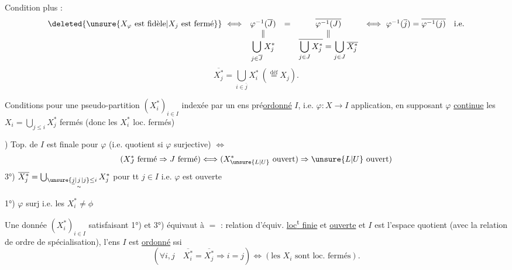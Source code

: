 Condition plus  : 
\[
\begin{array}{rclcl}
\deleted{\unsure{X_\varphi\text{ est fidèle}|X_j\text{ est fermé}}}\ \Longleftrightarrow&
\varphi^{-1}(\overline J)&=&\overline{\varphi^{-1}(J)}&
\Longleftrightarrow\ \varphi^{-1}(\overline j)=\overline{\varphi^{-1}(j)}\quad\text{i.e.}\\
&\Vert&&\Vert&\\
&\displaystyle\bigcup_{j\in\overline J}X_j^*&&
\displaystyle\overline{\bigcup_{j\in J}X_j^*}=\bigcup_{j\in J}\overline{X_j^*}&
\end{array}
\]
\[
\overline{X_j^*}=\bigcup_{i\in\overline j}X_i^*\ (\overset{\mathrm{déf}}=X_j).
\]

Conditions pour une pseudo-partition $(X_i^*)_{i\in I}$  indexée par un ens
pré\uline{ordonné} $I$, i.e. $\varphi:X\longrightarrow I$ application, en supposant $\varphi$ \uline{continue}
 les $X_i=\bigcup_{j\leq i}X_j^*$ fermés (donc les $X_i^*$ loc. fermés)

) Top. de $I$ est finale pour $\varphi$ (i.e. quotient si $\varphi$ surjective) $\Longleftrightarrow$
\[
(X_J^*\text{ fermé}\Rightarrow J\text{ fermé})\Longleftrightarrow
(X_{\unsure{L|U}}^*\text{ ouvert})\Rightarrow\unsure{L|U}\text{ ouvert})
\]
3°) $\overline{X_j^*}=\bigcup_{\unsure{\underline{j}|\underset{\sim}{j}|j}\leq i}X_j^*$ pour tt $j\in I$ i.e. $\varphi$ est ouverte

1°) $\varphi$ surj i.e. les $X_i^*\ne\phi$

Une donnée $(X_i^*)_{i\in I}$ satisfaisant 1°) et 3°) équivaut à
$=$ :  relation d'équiv. \uline{loc\textsuperscript{t} finie} et \uline{ouverte}
et $I$ est l'espace quotient (avec la relation de ordre
de spécialisation),  l'ens $I$ est \uline{ordonné} ssi
\[
(\forall i,j\quad\overline{X_i^*}=\overline{X_j^*}\Rightarrow i=j)
\Longleftrightarrow(\text{les }X_i\text{ sont loc. fermés}).
\]

